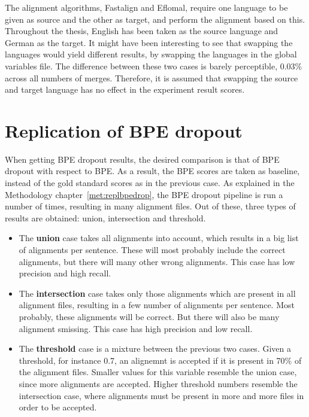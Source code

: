 The alignment algorithms, Fastalign and Eflomal, require one language to be given as source and the other as target, and perform the alignment based on this. Throughout the thesis, English has been taken as the source language and German as the target. It might have been interesting to see that swapping the languages would yield different results, by swapping the languages in the global variables file. The difference between these two cases is barely perceptible, 0.03\% across all numbers of merges. Therefore, it is assumed that swapping the source and target language has no effect in the experiment result scores.

\section{Replication of BPE dropout}

When getting BPE dropout results, the desired comparison is that of BPE dropout with respect to BPE. As a result, the BPE scores are taken as baseline, instead of the gold standard scores as in the previous case. As explained in the Methodology chapter~\ref{met:replbpedrop}, the BPE dropout pipeline is run a number of times, resulting in many alignment files. Out of these, three types of results are obtained: union, intersection and threshold.

\begin{itemize}
	\item The \textbf{union} case takes all alignments into account, which results in a big list of alignments per sentence. These will most probably include the correct alignments, but there will many other wrong alignments. This case has low precision and high recall.
	\item The \textbf{intersection} case takes only those alignments which are present in all alignment files, resulting in a few number of alignments per sentence. Most probably, these alignments will be correct. But there will also be many alignment smissing. This case has high precision and low recall.
	\item The \textbf{threshold} case is a mixture between the previous two cases. Given a threshold, for instance 0.7, an alignemnt is accepted if it is present in 70\% of the alignment files. Smaller values for this variable resemble the union case, since more alignments are accepted. Higher threshold numbers resemble the intersection case, where alignments must be present in more and more files in order to be accepted.
\end{itemize}

